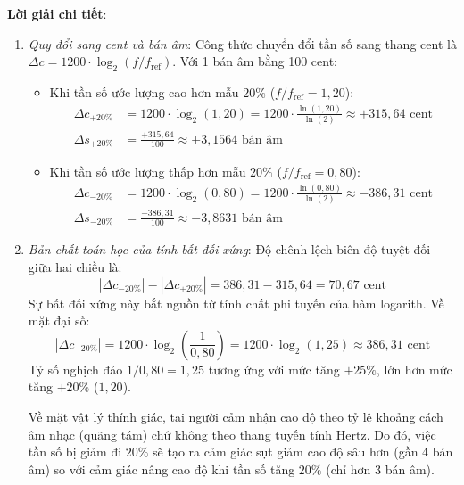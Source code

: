 \textbf{Lời giải chi tiết}:
\begin{enumerate}[label=(\alph*)]
    \item \emph{Quy đổi sang cent và bán âm}:
    Công thức chuyển đổi tần số sang thang cent là $\Delta c = 1200 \cdot \log_2(f / f_{\text{ref}})$. Với 1 bán âm bằng 100 cent:
    \begin{itemize}
        \item Khi tần số ước lượng cao hơn mẫu $20\%$ ($f / f_{\text{ref}} = 1{,}20$):
        \begin{align}
            \Delta c_{+20\%} &= 1200 \cdot \log_2(1{,}20) = 1200 \cdot \frac{\ln(1{,}20)}{\ln(2)} \approx +315{,}64\text{ cent} \\
            \Delta s_{+20\%} &= \frac{+315{,}64}{100} \approx +3{,}1564\text{ bán âm}
        \end{align}
        \item Khi tần số ước lượng thấp hơn mẫu $20\%$ ($f / f_{\text{ref}} = 0{,}80$):
        \begin{align}
            \Delta c_{-20\%} &= 1200 \cdot \log_2(0{,}80) = 1200 \cdot \frac{\ln(0{,}80)}{\ln(2)} \approx -386{,}31\text{ cent} \\
            \Delta s_{-20\%} &= \frac{-386{,}31}{100} \approx -3{,}8631\text{ bán âm}
        \end{align}
    \end{itemize}

    \item \emph{Bản chất toán học của tính bất đối xứng}:
    Độ chênh lệch biên độ tuyệt đối giữa hai chiều là:
    \begin{equation}
        |\Delta c_{-20\%}| - |\Delta c_{+20\%}| = 386{,}31 - 315{,}64 = 70{,}67\text{ cent}
    \end{equation}
    Sự bất đối xứng này bắt nguồn từ tính chất phi tuyến của hàm logarith. Về mặt đại số:
    \begin{equation}
        |\Delta c_{-20\%}| = 1200 \cdot \log_2\left(\frac{1}{0{,}80}\right) = 1200 \cdot \log_2(1{,}25) \approx 386{,}31\text{ cent}
    \end{equation}
    Tỷ số nghịch đảo $1 / 0{,}80 = 1{,}25$ tương ứng với mức tăng $+25\%$, lớn hơn mức tăng $+20\%$ ($1{,}20$). 
    
    Về mặt vật lý thính giác, tai người cảm nhận cao độ theo tỷ lệ khoảng cách âm nhạc (quãng tám) chứ không theo thang tuyến tính Hertz. Do đó, việc tần số bị giảm đi $20\%$ sẽ tạo ra cảm giác sụt giảm cao độ sâu hơn (gần 4 bán âm) so với cảm giác nâng cao độ khi tần số tăng $20\%$ (chỉ hơn 3 bán âm).
\end{enumerate}


